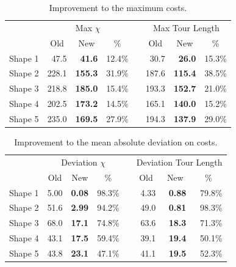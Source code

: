 \documentclass[../main.tex]{subfiles}
\begin{document}
\begin{table}
	\centering
	\caption{Improvement to the maximum costs.}
	\label{table:decomposition_improvement_max}
	\begin{tabular}{@{}l rrrrrrr}
		\toprule
		& \multicolumn{3}{c}{Max $\chi$} && \multicolumn{3}{c}{Max Tour Length} \\
		\cmidrule{2-4} \cmidrule{6-8}
		& \multicolumn{1}{c}{Old} & \multicolumn{1}{c}{New} & \multicolumn{1}{c}{\%} & & \multicolumn{1}{c}{Old} & \multicolumn{1}{c}{New} & \multicolumn{1}{c}{\%}  \\
		\cmidrule{1-8}
		Shape 1 & 47.5  & \bf{41.6}  & 12.4\% && 30.7  & \bf{26.0}  & 15.3\% \\
		Shape 2 & 228.1 & \bf{155.3} & 31.9\% && 187.6 & \bf{115.4} & 38.5\% \\
		Shape 3 & 218.8 & \bf{185.0} & 15.4\% && 193.3 & \bf{152.7} & 21.0\% \\
		Shape 4 & 202.5 & \bf{173.2} & 14.5\% && 165.1 & \bf{140.0} & 15.2\% \\
		Shape 5 & 235.0 & \bf{169.5} & 27.9\% && 194.3 & \bf{137.9} & 29.0\% \\
		\bottomrule
	\end{tabular}
\end{table}

\begin{table}
	\centering
	\caption{Improvement to the mean absolute deviation on costs.}
	\label{table:decomposition_improvement_deviation}
	\begin{tabular}{@{}l rrrrrrr}
		\toprule
		& \multicolumn{3}{c}{Deviation $\chi$} && \multicolumn{3}{c}{Deviation Tour Length} \\
		\cmidrule{2-4} \cmidrule{6-8}
		& \multicolumn{1}{c}{Old} & \multicolumn{1}{c}{New} & \multicolumn{1}{c}{\%} & & \multicolumn{1}{c}{Old} & \multicolumn{1}{c}{New} & \multicolumn{1}{c}{\%}  \\
		\cmidrule{1-8}
		Shape 1 & 5.00 & \bf{0.08} & 98.3\% && 4.33 & \bf{0.88} & 79.8\% \\
		Shape 2 & 51.6 & \bf{2.99} & 94.2\% && 49.0 & \bf{0.81} & 98.3\% \\
		Shape 3 & 68.0 & \bf{17.1} & 74.8\% && 63.6 & \bf{18.3} & 71.3\% \\
		Shape 4 & 43.1 & \bf{17.5} & 59.4\% && 39.1 & \bf{19.4} & 50.1\% \\
		Shape 5 & 43.8 & \bf{23.1} & 47.1\% && 41.1 & \bf{19.5} & 52.3\% \\
		\bottomrule
	\end{tabular}
\end{table}
\end{document}

